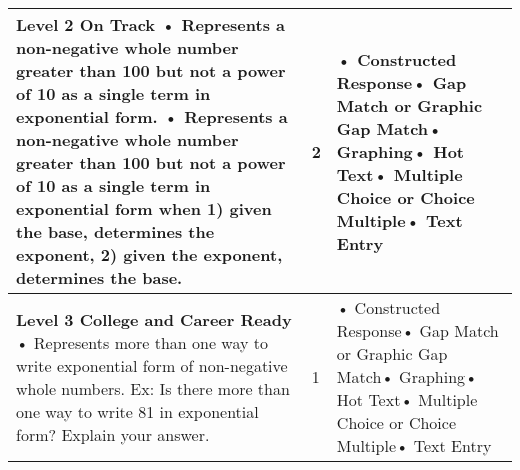\documentclass[11pt, English]{article}
\begin{document}
\begin{longtable}{|p{11.0cm}|p{1.8cm}|p{3.7cm}|}
\textbf{Level 2 On Track}\newline
• Represents a non-negative whole number greater than 100 but not a power of 10 as a single term in exponential form. \newline• Represents a non-negative whole number greater than 100 but not a power of 10 as a single term in exponential form when 1) given the base, determines the exponent, 2) given the exponent, determines the base.\newline

 & \hfil{2}
 &• Constructed Response\newline• Gap Match or Graphic Gap Match\newline• Graphing\newline• Hot Text\newline• Multiple Choice or Choice Multiple\newline• Text Entry\\
\hline


 
\textbf{Level 3 College and Career Ready}\newline
• Represents more than one way to write exponential form of non-negative whole numbers. Ex: Is there more than one way to write 81 in exponential form? Explain your answer. \newline

& \hfil{1}
&• Constructed Response\newline• Gap Match or Graphic Gap Match\newline• Graphing\newline• Hot Text\newline• Multiple Choice or Choice Multiple\newline• Text Entry\\
\hline 


\end{longtable}
\end{document}
